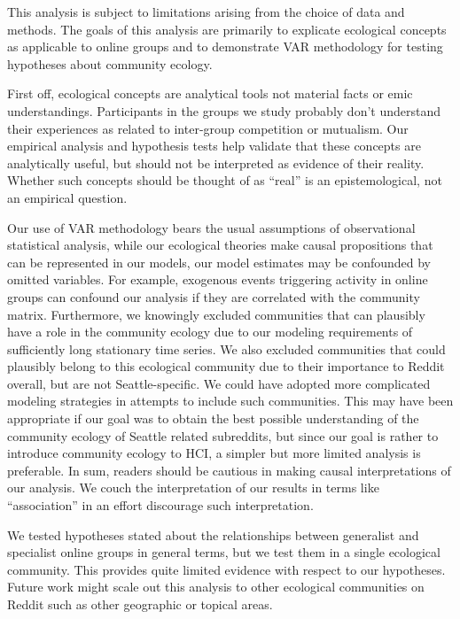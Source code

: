 \documentclass[12pt]{memoir}
\begin{document}
This analysis is subject to limitations arising from the choice of data and methods. The goals of this analysis are primarily to explicate ecological concepts as applicable to online groups and to demonstrate VAR methodology for testing hypotheses about community ecology.

First off, ecological concepts are analytical tools not material facts or emic understandings.  Participants in the groups we study probably don't  understand their experiences as related to inter-group competition or mutualism.  Our empirical analysis and hypothesis tests help validate that these concepts are analytically useful, but should not be interpreted as evidence of their reality.  Whether such concepts should be thought of as ``real'' is an epistemological, not an empirical question.

Our use of VAR methodology bears the usual assumptions of observational statistical analysis, while our ecological theories make causal propositions that can be represented in our models, our model estimates may be confounded by omitted variables.  For example, exogenous events triggering activity in online groups can confound our analysis if they are correlated with the community matrix.  Furthermore, we knowingly excluded communities that can plausibly have a role in the community ecology due to our modeling requirements of sufficiently long stationary time series. We also excluded communities that could plausibly belong to this ecological community due to their importance to Reddit overall, but are not Seattle-specific. We could have adopted more complicated modeling strategies in attempts to include such communities.  This may have been appropriate if our goal was to obtain the best possible understanding of the community ecology of Seattle related subreddits, but since our goal is rather to introduce community ecology to HCI, a simpler but more limited analysis is preferable.  In sum, readers should be cautious in making causal interpretations of our analysis. We couch the interpretation of our results in terms like ``association'' in an effort discourage such interpretation.

We tested hypotheses stated about the relationships between generalist and specialist online groups in general terms, but we test them in a single ecological community.  This provides quite limited evidence with respect to our hypotheses. Future work might scale out this analysis to other ecological communities on Reddit such as other geographic or topical areas.


\setcounter{biburlnumpenalty}{9001}
\printbibliography[title = {References}, heading=secbib]
\end{document}
